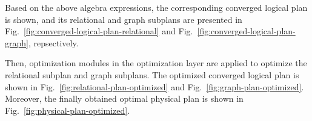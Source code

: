 \begin{example}
    Based on the above algebra expressions, the corresponding converged logical plan is shown, and its relational and graph subplans are presented in Fig.~\ref{fig:converged-logical-plan-relational} and Fig.~\ref{fig:converged-logical-plan-graph}, repsectively.
    
    Then, optimization modules in the optimization layer are applied to optimize the relational subplan and graph subplans.
    The optimized converged logical plan is shown in Fig.~\ref{fig:relational-plan-optimized} and Fig.~\ref{fig:graph-plan-optimized}.
    Moreover, the finally obtained optimal physical plan is shown in Fig.~\ref{fig:physical-plan-optimized}.
\end{example}

